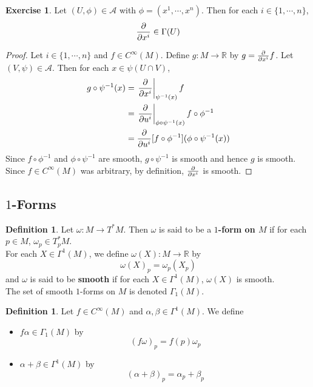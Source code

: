 \documentclass[12pt]{amsart}
\theoremstyle{definition}
\newtheorem{defn}[definition]{Definition}
\newtheorem{ex}[definition]{Exercise}
\newcommand{\al}{\alpha}
\newcommand{\Gam}{\Gamma}
\newcommand{\bet}{\beta}
\newcommand{\om}{\omega}
\newcommand{\R}{\mathbb{R}}
\newcommand{\MA}{\mathcal{A}}
\begin{document}
	\begin{ex}
	Let $(U, \phi) \in \MA$ with $\phi = (x^1, \cdots, x^n)$. Then for each $i \in \{1, \cdots, n\}$, $$\pdv{x^i} \in \Gam(U)$$
	\end{ex}
	
	\begin{proof}
	Let $i \in \{1, \cdots, n\}$ and $f \in C^{\infty}(M)$. Define $g: M \rightarrow \R$ by $g = \pdv{x^i} f$. Let $(V, \psi) \in \MA$. Then for each $x \in \psi(U \cap V)$, 
	\begin{align*}
	g \circ \psi^{-1}(x) 
	&= \eval{\pdv{x^i}}_{\psi^{-1}(x)}f \\
	&= \eval{\pdv{u^i}}_{\phi \circ \psi^{-1}(x)}f \circ \phi^{-1}  \\
	&= \pdv{u^i}[f \circ \phi^{-1}] ( \phi \circ \psi^{-1} (x))\\
\end{align*}	 
	Since $f \circ \phi^{-1}$ and $\phi \circ \psi^{-1}$ are smooth, $g \circ \psi^{-1}$ is smooth and hence $g$ is smooth. Since $f \in C^{\infty}(M)$ was arbitrary, by definition, $\pdv{x^i}$ is smooth. 
	\end{proof}
	
	
	
	
	
	
	
	\newpage
	\subsection{$1$-Forms}
	
	\begin{defn}
		Let $\om: M \rightarrow T^*M$. Then $\om$ is said to be a \textbf{$1$-form on $M$} if for each $p \in M$, $\om_p \in T^*_p M$. \\
		For each $X \in \Gam^1(M)$, we define $\om(X) : M \rightarrow \R$ by $$\om(X)_p = \om_p(X_p)$$
		and $\om$ is said to be \textbf{smooth} if for each $X \in \Gam^1(M)$, $\om(X)$ is smooth. \\
		The set of smooth $1$-forms on $M$ is denoted $\Gam_1(M)$.\\
	\end{defn}

	\begin{defn}
	Let $f \in C^{\infty}(M)$ and $\al,\bet \in \Gam^1(M)$. We define 
	\begin{itemize}
	\item $f\al \in \Gam_1(M)$ by $$(f\om)_p = f(p)\om_p$$
	\item $\al+\bet \in \Gam^1(M)$ by $$(\al+\bet)_p = \al_p+\bet_p$$
	\end{itemize}
	\end{defn}
	
\end{document}
